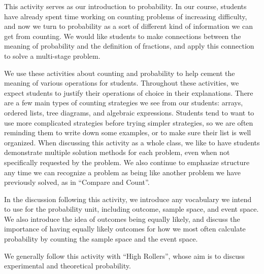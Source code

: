 \documentclass[nooutcomes]{ximera}
\begin{document}
\newpage
\begin{instructorNotes}
This activity serves as our introduction to probability.  In our course, students have already spent time working on counting problems of increasing difficulty, and now we turn to probability as a sort of different kind of information we can get from counting.  We would like students to make connections between the meaning of probability and the definition of fractions, and apply this connection to solve a multi-stage problem.

We use these activities about counting and probability to help cement the meaning of various operations for students.  Throughout these activities, we expect students to justify their operations of choice in their explanations.  There are a few main types of counting strategies we see from our students: arrays, ordered lists, tree diagrams, and algebraic expressions.  Students tend to want to use more complicated strategies before trying simpler strategies, so we are often reminding them to write down some examples, or to make sure their list is well organized. When discussing this activity as a whole class, we like to have students demonstrate multiple solution methods for each problem, even when not specifically requested by the problem.  We also continue to emphasize structure any time we can recognize a problem as being like another problem we have previously solved, as in ``Compare and Count''.

In the discussion following this activity, we introduce any vocabulary we intend to use for the probability unit, including outcome, sample space, and event space.  We also introduce the idea of outcomes being equally likely, and discuss the importance of having equally likely outcomes for how we most often calculate probability by counting the sample space and the event space.

We generally follow this activity with ``High Rollers'', whose aim is to discuss experimental and theoretical probability.

\end{instructorNotes}
\end{document}
